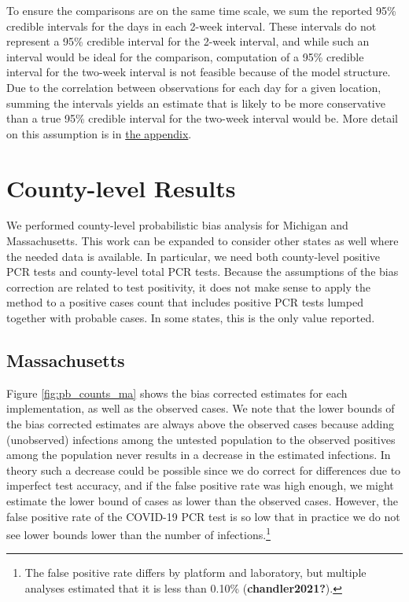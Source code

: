 \documentclass[12pt,twoside]{smiththesis}
\begin{document}
To ensure the comparisons are on the same time scale, we sum the reported 95\% credible intervals for the days in each 2-week interval. These intervals do not represent a 95\% credible interval for the 2-week interval, and while such an interval would be ideal for the comparison, computation of a 95\% credible interval for the two-week interval is not feasible because of the model structure. Due to the correlation between observations for each day for a given location, summing the intervals yields an estimate that is likely to be more conservative than a true 95\% credible interval for the two-week interval would be. More detail on this assumption is in \protect\hyperlink{conservativeintervals}{the appendix}.

\hypertarget{county-level-results}{%
\section{County-level Results}\label{county-level-results}}

We performed county-level probabilistic bias analysis for Michigan and Massachusetts. This work can be expanded to consider other states as well where the needed data is available. In particular, we need both county-level positive PCR tests and county-level total PCR tests. Because the assumptions of the bias correction are related to test positivity, it does not make sense to apply the method to a positive cases count that includes positive PCR tests lumped together with probable cases. In some states, this is the only value reported.

\hypertarget{massachusetts}{%
\subsection{Massachusetts}\label{massachusetts}}

Figure \ref{fig:pb_counts_ma} shows the bias corrected estimates for each implementation, as well as the observed cases. We note that the lower bounds of the bias corrected estimates are always above the observed cases because adding (unobserved) infections among the untested population to the observed positives among the population never results in a decrease in the estimated infections. In theory such a decrease could be possible since we do correct for differences due to imperfect test accuracy, and if the false positive rate was high enough, we might estimate the lower bound of cases as lower than the observed cases. However, the false positive rate of the COVID-19 PCR test is so low that in practice we do not see lower bounds lower than the number of infections.\footnote{The false positive rate differs by platform and laboratory, but multiple analyses estimated that it is less than 0.10\% (\textbf{chandler2021?}).}
\end{document}

